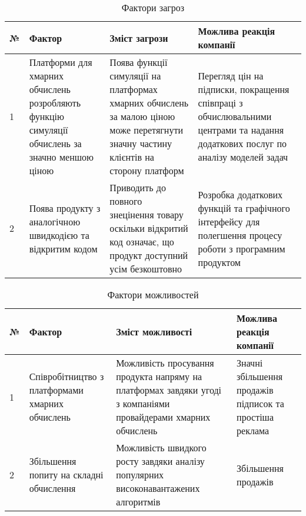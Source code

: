 \begin{table}[H]
	\begin{tabular}
		{|l|p{4cm}|p{4cm}|p{4cm}|} \hline
		№ & Фактор & Зміст загрози & Можлива реакція компанії \\ \hline
		1
		& Платформи для хмарних обчислень розробляють функцію симуляції обчислень за значно меншою ціною
		& Поява функції симуляції на платформах хмарних обчислень за малою ціною може перетягнути значну частину клієнтів на сторону платформ
		& Перегляд цін на підписки, покращення співпраці з обчислювальними центрами та надання додаткових послуг по аналізу моделей задач
		\\ \hline
		
		2
		& Поява продукту з аналогічною швидкодією та відкритим кодом
		& Приводить до повного знецінення товару оскільки відкритий код означає, що продукт доступний усім безкоштовно
		& Розробка додаткових функцій та графічного інтерфейсу для полегшення процесу роботи з програмним продуктом
		\\ \hline
	\end{tabular}
	\caption{Фактори загроз}
\end{table}

\begin{table}[H]
	\begin{tabular}
		{|l|p{4cm}|p{4cm}|p{4cm}|} \hline
		№ & Фактор & Зміст можливості & Можлива реакція компанії \\ \hline
		1
		& Співробітництво з платформами хмарних обчислень
		& Можливість просування продукта напряму на платформах завдяки угоді з компаніями провайдерами хмарних обчислень
		& Значні збільшення продажів підписок та простіша реклама
		\\ \hline
		
		2
		& Збільшення попиту на складні обчислення
		& Можливість швидкого росту завдяки аналізу популярних високонавантажених алгоритмів
		& Збільшення продажів
		\\ \hline
	\end{tabular}
	\caption{Фактори можливостей}
\end{table}


